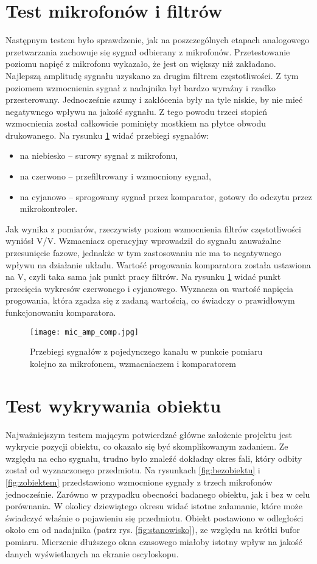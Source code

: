 \section{Test mikrofonów i filtrów}
Następnym testem było sprawdzenie, jak na poszczególnych etapach analogowego przetwarzania zachowuje się sygnał odbierany z mikrofonów. 
Przetestowanie poziomu napięć z mikrofonu wykazało, że jest on większy niż zakładano. 
Najlepszą amplitudę sygnału uzyskano za drugim filtrem częstotliwości. Z tym poziomem wzmocnienia sygnał z nadajnika był bardzo wyraźny i 
rzadko przesterowany. Jednocześnie szumy i zakłócenia były na tyle niskie, by nie mieć negatywnego wpływu na jakość sygnału. 
Z tego powodu trzeci stopień wzmocnienia został całkowicie pominięty mostkiem na płytce obwodu drukowanego. 
Na rysunku \ref{fig:mic_amp_comp} widać przebiegi sygnałów:
\begin{itemize}
    \item na niebiesko -- surowy sygnał z mikrofonu,
    \item na czerwono -- przefiltrowany i wzmocniony sygnał,
    \item na cyjanowo -- sprogowany sygnał przez komparator, gotowy do odczytu przez mikrokontroler.
\end{itemize} 
Jak wynika z pomiarów, rzeczywisty poziom wzmocnienia filtrów częstotliwości wyniósł \unit[40]{V/V}. Wzmacniacz operacyjny wprowadził do sygnału 
zauważalne przesunięcie fazowe, jednakże w tym zastosowaniu nie ma to negatywnego wpływu na działanie układu. Wartość progowania komparatora
została ustawiona na \unit[1,65]{V}, czyli taka sama jak punkt pracy filtrów. Na rysunku \ref{fig:mic_amp_comp} widać punkt przecięcia wykresów czerwonego i cyjanowego. 
Wyznacza on wartość napięcia progowania, która zgadza się z zadaną wartością, co świadczy o prawidłowym funkcjonowaniu komparatora.  


\begin{figure}[!ht]
    \centering
    \texttt{[image: mic\_amp\_comp.jpg]}
    \caption{Przebiegi sygnałów z pojedynczego kanału w punkcie pomiaru kolejno za mikrofonem, wzmacniaczem i komparatorem}
    \label{fig:mic_amp_comp}
\end{figure}

\section{Test wykrywania obiektu}
Najważniejszym testem mającym potwierdzać główne założenie projektu jest wykrycie pozycji obiektu, co okazało się być skomplikowanym zadaniem. 
Ze względu na echo sygnału, trudno było znaleźć dokładny okres fali, który odbity został od wyznaczonego przedmiotu.
Na rysunkach \ref{fig:bezobiektu} i \ref{fig:zobiektem} przedstawiono wzmocnione sygnały z trzech mikrofonów jednocześnie. 
Zarówno w przypadku obecności badanego obiektu, jak i bez w celu porównania. 
W okolicy dziewiątego okresu widać istotne załamanie, które może świadczyć właśnie o pojawieniu się przedmiotu. 
Obiekt postawiono w odległości około \unit[4]{cm} od nadajnika (patrz rys. \ref{fig:stanowisko}), ze względu na krótki bufor pomiaru. 
Mierzenie dłuższego okna czasowego miałoby istotny wpływ na jakość danych wyświetlanych na ekranie oscyloskopu.

